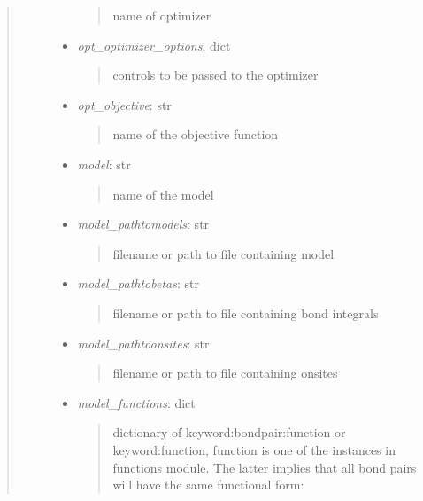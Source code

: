 \documentclass[letterpaper,10pt,english]{sphinxmanual}
\begin{document}
\begin{fulllineitems}
\begin{quote}
\begin{description}
\begin{itemize}
\begin{quote}
name of optimizer
\end{quote}

\item {} 
\emph{opt\_optimizer\_options}: dict
\begin{quote}

controls to be passed to the optimizer
\end{quote}

\item {} 
\emph{opt\_objective}: str
\begin{quote}

name of the objective function
\end{quote}

\item {} 
\emph{model}: str
\begin{quote}

name of the model
\end{quote}

\item {} 
\emph{model\_pathtomodels}: str
\begin{quote}

filename or path to file containing model
\end{quote}

\item {} 
\emph{model\_pathtobetas}: str
\begin{quote}

filename or path to file containing bond integrals
\end{quote}

\item {} 
\emph{model\_pathtoonsites}: str
\begin{quote}

filename or path to file containing onsites
\end{quote}

\item {} 
\emph{model\_functions}: dict
\begin{quote}

dictionary of keyword:bondpair:function or keyword:function, 
function is one of the instances in functions module. The latter
implies that all bond pairs will have the same functional form:


\end{quote}
\end{itemize}
\end{description}
\end{quote}
\end{fulllineitems}
\end{document}
